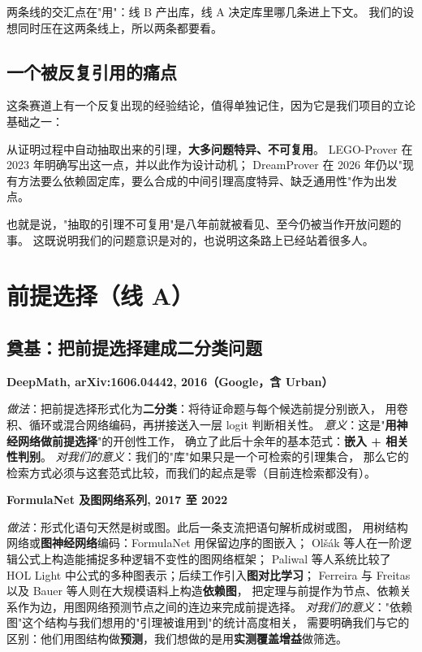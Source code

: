 \documentclass[UTF8,a4paper,11pt,fontset=windows]{ctexart}
\newcommand{\paper}[1]{\par\medskip\noindent\textbf{\color{sgblue!80!black}#1}\par\nobreak\vspace{1pt}}
\newcommand{\field}[1]{\textit{#1}：}
\begin{document}
两条线的交汇点在"用"：线 B 产出库，线 A 决定库里哪几条进上下文。
我们的设想同时压在这两条线上，所以两条都要看。

\subsection{一个被反复引用的痛点}

这条赛道上有一个反复出现的经验结论，值得单独记住，因为它是我们项目的立论基础之一：

\begin{keybox}
从证明过程中自动抽取出来的引理，\textbf{大多问题特异、不可复用}。
LEGO-Prover 在 2023 年明确写出这一点，并以此作为设计动机；
DreamProver 在 2026 年仍以"现有方法要么依赖固定库，要么合成的中间引理高度特异、缺乏通用性"作为出发点。
\end{keybox}

也就是说，"抽取的引理不可复用"是八年前就被看见、至今仍被当作开放问题的事。
这既说明我们的问题意识是对的，也说明这条路上已经站着很多人。

\section{前提选择（线 A）}

\subsection{奠基：把前提选择建成二分类问题}

\paper{DeepMath, arXiv:1606.04442, 2016（Google，含 Urban）}
\field{做法}把前提选择形式化为\textbf{二分类}：将待证命题与每个候选前提分别嵌入，
用卷积、循环或混合网络编码，再拼接送入一层 logit 判断相关性。
\field{意义}这是"\textbf{用神经网络做前提选择}"的开创性工作，
确立了此后十余年的基本范式：\textbf{嵌入 + 相关性判别}。
\field{对我们的意义}我们的"库"如果只是一个可检索的引理集合，
那么它的检索方式必须与这套范式比较，而我们的起点是零（目前连检索都没有）。

\paper{FormulaNet 及图网络系列, 2017 至 2022}
\field{做法}形式化语句天然是树或图。此后一条支流把语句解析成树或图，
用树结构网络或\textbf{图神经网络}编码：FormulaNet 用保留边序的图嵌入；
Olšák 等人在一阶逻辑公式上构造能捕捉多种逻辑不变性的图网络框架；
Paliwal 等人系统比较了 HOL Light 中公式的多种图表示；后续工作引入\textbf{图对比学习}；
Ferreira 与 Freitas 以及 Bauer 等人则在大规模语料上构造\textbf{依赖图}，
把定理与前提作为节点、依赖关系作为边，用图网络预测节点之间的连边来完成前提选择。
\field{对我们的意义}"依赖图"这个结构与我们想用的"引理被谁用到"的统计高度相关，
需要明确我们与它的区别：他们用图结构做\textbf{预测}，我们想做的是用\textbf{实测覆盖增益}做筛选。
\end{document}
